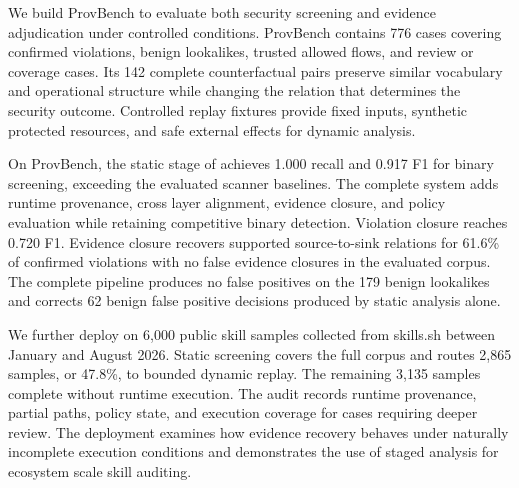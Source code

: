 We build ProvBench to evaluate both security screening and evidence
adjudication under controlled conditions. ProvBench contains 776 cases
covering confirmed violations, benign lookalikes, trusted allowed flows, and
review or coverage cases. Its 142 complete counterfactual pairs preserve
similar vocabulary and operational structure while changing the relation that
determines the security outcome. Controlled replay fixtures provide fixed
inputs, synthetic protected resources, and safe external effects for dynamic
analysis.

On ProvBench, the static stage of \system achieves 1.000 recall and 0.917 F1
for binary screening, exceeding the evaluated scanner baselines. The complete
system adds runtime provenance, cross layer alignment, evidence closure, and
policy evaluation while retaining competitive binary detection. Violation
closure reaches 0.720 F1. Evidence closure recovers supported source-to-sink
relations for 61.6\% of confirmed violations with no false evidence closures
in the evaluated corpus. The complete pipeline produces no false positives on
the 179 benign lookalikes and corrects 62 benign false positive decisions
produced by static analysis alone.

We further deploy \system on 6,000 public skill samples collected from
skills.sh between January and August 2026. Static screening covers the full
corpus and routes 2,865 samples, or 47.8\%, to bounded dynamic replay. The
remaining 3,135 samples complete without runtime execution. The audit records
runtime provenance, partial paths, policy state, and execution coverage for
cases requiring deeper review. The deployment examines how evidence recovery
behaves under naturally incomplete execution conditions and demonstrates the
use of staged analysis for ecosystem scale skill auditing.


